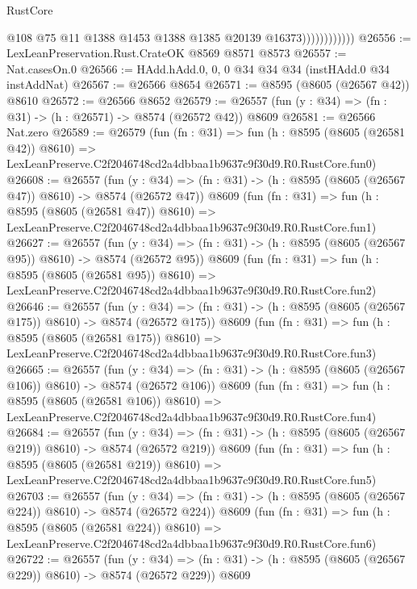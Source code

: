 \begin{lexlean}{RustCore}
\begin{coremodule}
                            @108
                            @75
                            @11
                            @1388
                            @1453
                            @1388
                            @1385
                            @20139
                            @16373))))))))))))
@26556 := LexLeanPreservation.Rust.CrateOK @8569 @8571 @8573
@26557 := Nat.casesOn.{0}
@26566 := HAdd.hAdd.{0, 0, 0} @34 @34 @34 (instHAdd.{0} @34 instAddNat)
@26567 := @26566 @8654
@26571 := @8595 (@8605 (@26567 @42)) @8610
@26572 := @26566 @8652
@26579 := @26557 (fun (y : @34) => (fn : @31) -> (h : @26571) -> @8574 (@26572 @42)) @8609
@26581 := @26566 Nat.zero
@26589 := @26579
    (fun (fn : @31) =>
    fun (h : @8595 (@8605 (@26581 @42)) @8610) =>
    LexLeanPreserve.C2f2046748cd2a4dbbaa1b9637c9f30d9.R0.RustCore.fun0)
@26608 := @26557
    (fun (y : @34) => (fn : @31) -> (h : @8595 (@8605 (@26567 @47)) @8610) -> @8574 (@26572 @47))
    @8609
    (fun (fn : @31) =>
    fun (h : @8595 (@8605 (@26581 @47)) @8610) =>
    LexLeanPreserve.C2f2046748cd2a4dbbaa1b9637c9f30d9.R0.RustCore.fun1)
@26627 := @26557
    (fun (y : @34) => (fn : @31) -> (h : @8595 (@8605 (@26567 @95)) @8610) -> @8574 (@26572 @95))
    @8609
    (fun (fn : @31) =>
    fun (h : @8595 (@8605 (@26581 @95)) @8610) =>
    LexLeanPreserve.C2f2046748cd2a4dbbaa1b9637c9f30d9.R0.RustCore.fun2)
@26646 := @26557
    (fun (y : @34) => (fn : @31) -> (h : @8595 (@8605 (@26567 @175)) @8610) -> @8574 (@26572 @175))
    @8609
    (fun (fn : @31) =>
    fun (h : @8595 (@8605 (@26581 @175)) @8610) =>
    LexLeanPreserve.C2f2046748cd2a4dbbaa1b9637c9f30d9.R0.RustCore.fun3)
@26665 := @26557
    (fun (y : @34) => (fn : @31) -> (h : @8595 (@8605 (@26567 @106)) @8610) -> @8574 (@26572 @106))
    @8609
    (fun (fn : @31) =>
    fun (h : @8595 (@8605 (@26581 @106)) @8610) =>
    LexLeanPreserve.C2f2046748cd2a4dbbaa1b9637c9f30d9.R0.RustCore.fun4)
@26684 := @26557
    (fun (y : @34) => (fn : @31) -> (h : @8595 (@8605 (@26567 @219)) @8610) -> @8574 (@26572 @219))
    @8609
    (fun (fn : @31) =>
    fun (h : @8595 (@8605 (@26581 @219)) @8610) =>
    LexLeanPreserve.C2f2046748cd2a4dbbaa1b9637c9f30d9.R0.RustCore.fun5)
@26703 := @26557
    (fun (y : @34) => (fn : @31) -> (h : @8595 (@8605 (@26567 @224)) @8610) -> @8574 (@26572 @224))
    @8609
    (fun (fn : @31) =>
    fun (h : @8595 (@8605 (@26581 @224)) @8610) =>
    LexLeanPreserve.C2f2046748cd2a4dbbaa1b9637c9f30d9.R0.RustCore.fun6)
@26722 := @26557
    (fun (y : @34) => (fn : @31) -> (h : @8595 (@8605 (@26567 @229)) @8610) -> @8574 (@26572 @229))
    @8609

\end{coremodule}
\end{lexlean}
